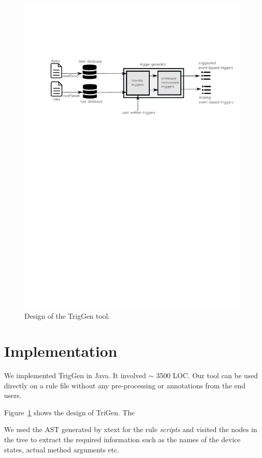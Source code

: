 \documentclass{sig-alternate-05-2015}
\begin{document}
\begin{figure}
\centering
\includegraphics [trim=0cm 18cm 0 5cm, scale=0.8]{images/design.pdf}
\caption{Design of the TrigGen tool.}
\label{fig:design}
\end{figure} 

\section{Implementation}
We implemented TrigGen in Java. It involved $\sim$ 3500 LOC. Our tool can be used directly on a rule file without any pre-processing or annotations from the end users. 

Figure~\ref{fig:design} shows the design of TriGen. The 

We used the AST generated by xtext for the rule \textit{scripts} and visited the nodes in the tree to extract the required information such as the names of the device states, actual method arguments etc.  
\end{document}
